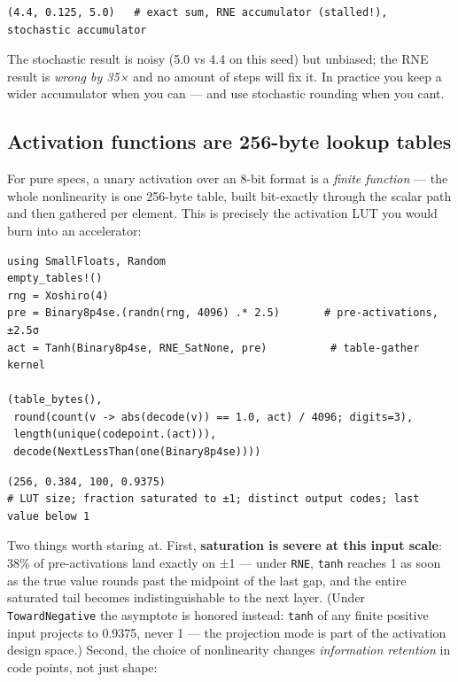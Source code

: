 \begin{verbatim}
(4.4, 0.125, 5.0)   # exact sum, RNE accumulator (stalled!), stochastic accumulator
\end{verbatim}



The stochastic result is noisy (5.0 vs 4.4 on this seed) but unbiased; the RNE result is \emph{wrong by 35×} and no amount of steps will fix it. In practice you keep a wider accumulator when you can — and use stochastic rounding when you can{\textquotesingle}t.



\subsection{Activation functions are 256-byte lookup tables}



\label{12405290678054954100}{}


For pure specs, a unary activation over an 8-bit format is a \emph{finite function} — the whole nonlinearity is one 256-byte table, built bit-exactly through the scalar path and then gathered per element. This is precisely the activation LUT you would burn into an accelerator:




\begin{verbatim}
using SmallFloats, Random
empty_tables!()
rng = Xoshiro(4)
pre = Binary8p4se.(randn(rng, 4096) .* 2.5)       # pre-activations, ±2.5σ
act = Tanh(Binary8p4se, RNE_SatNone, pre)          # table-gather kernel

(table_bytes(),
 round(count(v -> abs(decode(v)) == 1.0, act) / 4096; digits=3),
 length(unique(codepoint.(act))),
 decode(NextLessThan(one(Binary8p4se))))
\end{verbatim}




\begin{verbatim}
(256, 0.384, 100, 0.9375)
# LUT size; fraction saturated to ±1; distinct output codes; last value below 1
\end{verbatim}



Two things worth staring at. First, \textbf{saturation is severe at this input scale}: 38\% of pre-activations land exactly on ±1 — under \texttt{RNE}, \texttt{tanh} reaches 1 as soon as the true value rounds past the midpoint of the last gap, and the entire saturated tail becomes indistinguishable to the next layer. (Under \texttt{TowardNegative} the asymptote is honored instead: \texttt{tanh} of any finite positive input projects to 0.9375, never 1 — the projection mode is part of the activation design space.) Second, the choice of nonlinearity changes \emph{information retention} in code points, not just shape:




